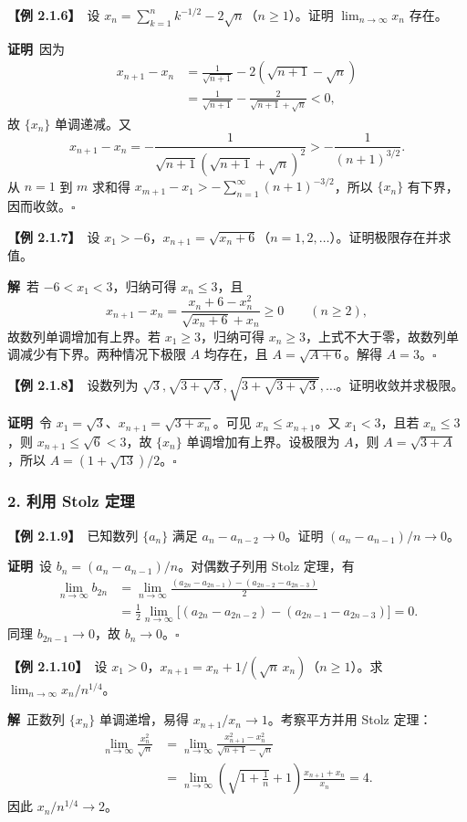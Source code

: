 \documentclass[UTF8,a4paper,11pt]{ctexart}
\newcommand{\ex}[1]{\par\medskip\noindent\textbf{【例 #1】}\ }
\newcommand{\pf}{\par\noindent\textbf{证明}\ }
\newcommand{\sol}{\par\noindent\textbf{解}\ }
\begin{document}
\ex{2.1.6}设 $x_n=\sum_{k=1}^{n}k^{-1/2}-2\sqrt n$（$n\ge1$）。证明 $\lim_{n\to\infty}x_n$ 存在。
\pf 因为
\begin{align*}
x_{n+1}-x_n
&=\frac1{\sqrt{n+1}}-2(\sqrt{n+1}-\sqrt n)\\
&=\frac1{\sqrt{n+1}}-\frac2{\sqrt{n+1}+\sqrt n}<0,
\end{align*}
故 $\{x_n\}$ 单调递减。又
\[
x_{n+1}-x_n=-\frac1{\sqrt{n+1}(\sqrt{n+1}+\sqrt n)^2}>-\frac1{(n+1)^{3/2}}.
\]
从 $n=1$ 到 $m$ 求和得 $x_{m+1}-x_1>-\sum_{n=1}^{\infty}(n+1)^{-3/2}$，所以 $\{x_n\}$ 有下界，因而收敛。\hfill$\square$

\ex{2.1.7}设 $x_1>-6$，$x_{n+1}=\sqrt{x_n+6}$（$n=1,2,\ldots$）。证明极限存在并求值。
\sol 若 $-6<x_1<3$，归纳可得 $x_n\le3$，且
\[
x_{n+1}-x_n=\frac{x_n+6-x_n^2}{\sqrt{x_n+6}+x_n}\ge0\qquad(n\ge2),
\]
故数列单调增加有上界。若 $x_1\ge3$，归纳可得 $x_n\ge3$，上式不大于零，故数列单调减少有下界。两种情况下极限 $A$ 均存在，且 $A=\sqrt{A+6}$。解得 $A=3$。\hfill$\square$

\ex{2.1.8}设数列为 $\sqrt3,\sqrt{3+\sqrt3},\sqrt{3+\sqrt{3+\sqrt3}},\ldots$。证明收敛并求极限。
\pf 令 $x_1=\sqrt3$、$x_{n+1}=\sqrt{3+x_n}$。可见 $x_n\le x_{n+1}$。又 $x_1<3$，且若 $x_n\le3$，则 $x_{n+1}\le\sqrt6<3$，故 $\{x_n\}$ 单调增加有上界。设极限为 $A$，则 $A=\sqrt{3+A}$，所以 $A=(1+\sqrt{13})/2$。\hfill$\square$

\subsubsection*{2. 利用 Stolz 定理}
\ex{2.1.9}已知数列 $\{a_n\}$ 满足 $a_n-a_{n-2}\to0$。证明 $(a_n-a_{n-1})/n\to0$。
\pf 设 $b_n=(a_n-a_{n-1})/n$。对偶数子列用 Stolz 定理，有
\begin{align*}
\lim_{n\to\infty}b_{2n}
&=\lim_{n\to\infty}\frac{(a_{2n}-a_{2n-1})-(a_{2n-2}-a_{2n-3})}{2}\\
&=\frac12\lim_{n\to\infty}\bigl[(a_{2n}-a_{2n-2})-(a_{2n-1}-a_{2n-3})\bigr]=0.
\end{align*}
同理 $b_{2n-1}\to0$，故 $b_n\to0$。\hfill$\square$

\ex{2.1.10}设 $x_1>0$，$x_{n+1}=x_n+1/(\sqrt n\,x_n)$（$n\ge1$）。求 $\lim_{n\to\infty}x_n/n^{1/4}$。
\sol 正数列 $\{x_n\}$ 单调递增，易得 $x_{n+1}/x_n\to1$。考察平方并用 Stolz 定理：
\begin{align*}
\lim_{n\to\infty}\frac{x_n^2}{\sqrt n}
&=\lim_{n\to\infty}\frac{x_{n+1}^2-x_n^2}{\sqrt{n+1}-\sqrt n}\\
&=\lim_{n\to\infty}
\left(\sqrt{1+\frac1n}+1\right)
\frac{x_{n+1}+x_n}{x_n}=4.
\end{align*}
因此 $x_n/n^{1/4}\to2$。
\end{document}
